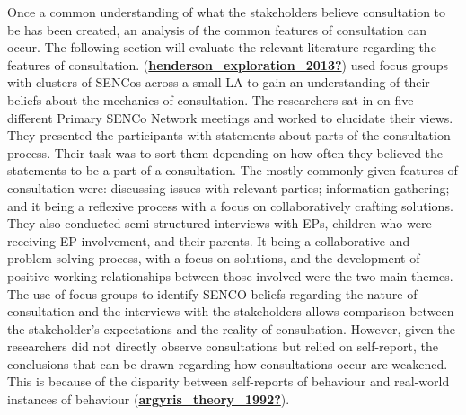 \documentclass[
]{article}
\begin{document}
Once a common understanding of what the stakeholders believe
consultation to be has been created, an analysis of the common features
of consultation can occur. The following section will evaluate the
relevant literature regarding the features of consultation.
(\protect\hyperlink{ref-henderson_exploration_2013}{\textbf{henderson\_exploration\_2013?}})
used focus groups with clusters of SENCos across a small LA to gain an
understanding of their beliefs about the mechanics of consultation. The
researchers sat in on five different Primary SENCo Network meetings and
worked to elucidate their views. They presented the participants with
statements about parts of the consultation process. Their task was to
sort them depending on how often they believed the statements to be a
part of a consultation. The mostly commonly given features of
consultation were: discussing issues with relevant parties; information
gathering; and it being a reflexive process with a focus on
collaboratively crafting solutions. They also conducted semi-structured
interviews with EPs, children who were receiving EP involvement, and
their parents. It being a collaborative and problem-solving process,
with a focus on solutions, and the development of positive working
relationships between those involved were the two main themes. The use
of focus groups to identify SENCO beliefs regarding the nature of
consultation and the interviews with the stakeholders allows comparison
between the stakeholder's expectations and the reality of consultation.
However, given the researchers did not directly observe consultations
but relied on self-report, the conclusions that can be drawn regarding
how consultations occur are weakened. This is because of the disparity
between self-reports of behaviour and real-world instances of behaviour
(\protect\hyperlink{ref-argyris_theory_1992}{\textbf{argyris\_theory\_1992?}}).
\end{document}
